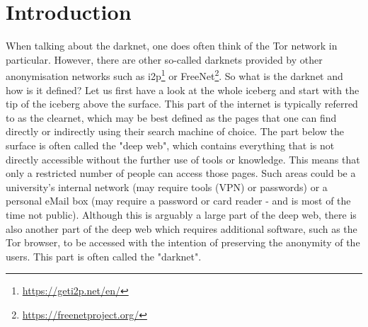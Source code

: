 \documentclass[USenglish,oneside,twocolumn]{article}
\begin{document}
\maketitle

\section{Introduction}
When talking about the darknet, one does often think of the Tor network in particular. However, there are other so-called darknets provided by other anonymisation networks such as i2p\footnote{\href{https://geti2p.net/en/}{https://geti2p.net/en/}} or FreeNet\footnote{\href{https://freenetproject.org/}{https://freenetproject.org/}}. So what is the darknet and how is it defined? Let us first have a look at the whole iceberg and start with the tip of the iceberg above the surface. This part of the internet is typically referred to as the clearnet, which may be best defined as the pages that one can find directly or indirectly using their search machine of choice. The part below the surface is often called the "deep web", which contains everything that is not directly accessible without the further use of tools or knowledge. This means that only a restricted number of people can access those pages. Such areas could be a university's internal network (may require tools (VPN) or passwords) or a personal eMail box (may require a password or card reader - and is most of the time not public).
Although this is arguably a large part of the deep web, there is also another part of the deep web which requires additional software, such as the Tor browser, to be accessed with the intention of preserving the anonymity of the users. This part is often called the "darknet". 
\end{document}
